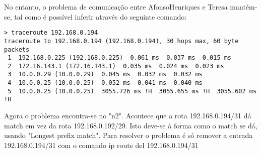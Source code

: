 \documentclass{article}
\begin{document}
No entanto, o problema de comunicação entre AfonsoHenriques e Teresa mantém-se, tal como é possível inferir através do seguinte comando:

\begin{lstlisting}
> traceroute 192.168.0.194                  
traceroute to 192.168.0.194 (192.168.0.194), 30 hops max, 60 byte packets
 1  192.168.0.225 (192.168.0.225)  0.061 ms  0.037 ms  0.015 ms
 2  172.16.143.1 (172.16.143.1)  0.035 ms  0.024 ms  0.023 ms
 3  10.0.0.29 (10.0.0.29)  0.045 ms  0.032 ms  0.032 ms
 4  10.0.0.25 (10.0.0.25)  0.052 ms  0.041 ms  0.040 ms
 5  10.0.0.25 (10.0.0.25)  3055.726 ms !H  3055.655 ms !H  3055.602 ms !H
\end{lstlisting}
Agora o problema encontra-se no "n2". Acontece que a rota 192.168.0.194/31 dá match em vez da rota 192.168.0.192/29. Isto deve-se à forma como o match se dá, usando "Longest prefix match". Para resolver o problema é só remover a entrada 192.168.0.194/31 com o comando ip route del 192.168.0.194/31
\end{document}
